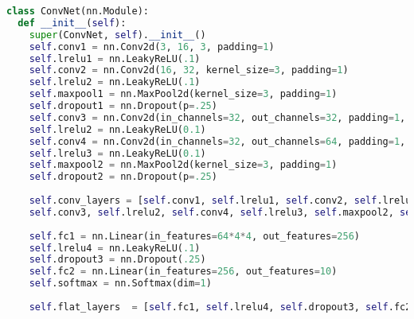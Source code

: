 \begin{lstlisting}[language=Python,caption={Typical (simple) CNN in pytorch}]
class ConvNet(nn.Module):
  def __init__(self):
    super(ConvNet, self).__init__()
    self.conv1 = nn.Conv2d(3, 16, 3, padding=1) 
    self.lrelu1 = nn.LeakyReLU(.1) 
    self.conv2 = nn.Conv2d(16, 32, kernel_size=3, padding=1)
    self.lrelu2 = nn.LeakyReLU(.1) 
    self.maxpool1 = nn.MaxPool2d(kernel_size=3, padding=1)
    self.dropout1 = nn.Dropout(p=.25)
    self.conv3 = nn.Conv2d(in_channels=32, out_channels=32, padding=1, kernel_size=3)
    self.lrelu2 = nn.LeakyReLU(0.1)
    self.conv4 = nn.Conv2d(in_channels=32, out_channels=64, padding=1, kernel_size=3)
    self.lrelu3 = nn.LeakyReLU(0.1)
    self.maxpool2 = nn.MaxPool2d(kernel_size=3, padding=1)
    self.dropout2 = nn.Dropout(p=.25)
    
    self.conv_layers = [self.conv1, self.lrelu1, self.conv2, self.lrelu2, self.maxpool1, self.dropout1, 
    self.conv3, self.lrelu2, self.conv4, self.lrelu3, self.maxpool2, self.dropout2]
    
    self.fc1 = nn.Linear(in_features=64*4*4, out_features=256)
    self.lrelu4 = nn.LeakyReLU(.1)
    self.dropout3 = nn.Dropout(.25) 
    self.fc2 = nn.Linear(in_features=256, out_features=10)
    self.softmax = nn.Softmax(dim=1) 
    
    self.flat_layers  = [self.fc1, self.lrelu4, self.dropout3, self.fc2, self.softmax]
\end{lstlisting}
